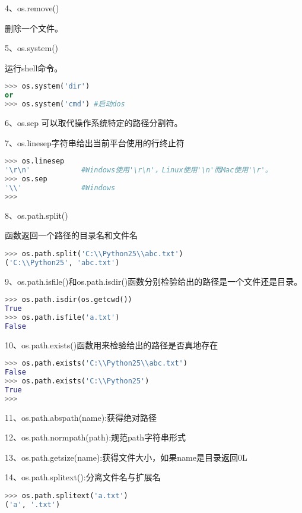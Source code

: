 4、os.remove()

删除一个文件。

5、os.system()

运行shell命令。
\begin{lstlisting}[language=Python]
>>> os.system('dir')
or
>>> os.system('cmd') #启动dos
\end{lstlisting}

6、os.sep 可以取代操作系统特定的路径分割符。

7、os.linesep字符串给出当前平台使用的行终止符
\begin{lstlisting}[language=Python]
>>> os.linesep
'\r\n'            #Windows使用'\r\n'，Linux使用'\n'而Mac使用'\r'。
>>> os.sep
'\\'              #Windows
>>> 
\end{lstlisting}

8、os.path.split()

函数返回一个路径的目录名和文件名
\begin{lstlisting}[language=Python]
>>> os.path.split('C:\\Python25\\abc.txt')
('C:\\Python25', 'abc.txt')
\end{lstlisting}

9、os.path.isfile()和os.path.isdir()函数分别检验给出的路径是一个文件还是目录。
\begin{lstlisting}[language=Python]
>>> os.path.isdir(os.getcwd())
True
>>> os.path.isfile('a.txt')
False
\end{lstlisting}

10、os.path.exists()函数用来检验给出的路径是否真地存在
\begin{lstlisting}[language=Python]
>>> os.path.exists('C:\\Python25\\abc.txt')
False
>>> os.path.exists('C:\\Python25')
True
>>> 
\end{lstlisting}

11、os.path.abspath(name):获得绝对路径

12、os.path.normpath(path):规范path字符串形式

13、os.path.getsize(name):获得文件大小，如果name是目录返回0L

14、os.path.splitext():分离文件名与扩展名
\begin{lstlisting}[language=Python]
>>> os.path.splitext('a.txt')
('a', '.txt')
\end{lstlisting}

